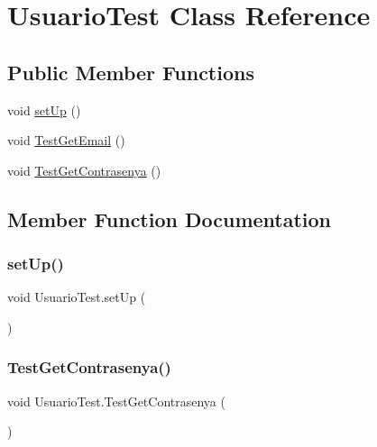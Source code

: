 \hypertarget{class_usuario_test}{}\section{Usuario\+Test Class Reference}
\label{class_usuario_test}
\subsection*{Public Member Functions}
\begin{DoxyCompactItemize}
\item 
void \mbox{\hyperlink{class_usuario_test_a266ea2808c28dc0e7a012f5145f5a09d}{set\+Up}} ()
\item 
void \mbox{\hyperlink{class_usuario_test_a1edbba82e373eca6120a82cf9e35ab69}{Test\+Get\+Email}} ()
\item 
void \mbox{\hyperlink{class_usuario_test_af7931a1dbcf5d80d80ffb49c30306ab7}{Test\+Get\+Contrasenya}} ()
\end{DoxyCompactItemize}


\subsection{Member Function Documentation}
\mbox{\label{class_usuario_test_a266ea2808c28dc0e7a012f5145f5a09d}} 
\subsubsection{\texorpdfstring{setUp()}{setUp()}}
{\footnotesize\ttfamily void Usuario\+Test.\+set\+Up (\begin{DoxyParamCaption}{ }\end{DoxyParamCaption})}

\mbox{\label{class_usuario_test_af7931a1dbcf5d80d80ffb49c30306ab7}} 
\subsubsection{\texorpdfstring{TestGetContrasenya()}{TestGetContrasenya()}}
{\footnotesize\ttfamily void Usuario\+Test.\+Test\+Get\+Contrasenya (\begin{DoxyParamCaption}{ }\end{DoxyParamCaption})}

